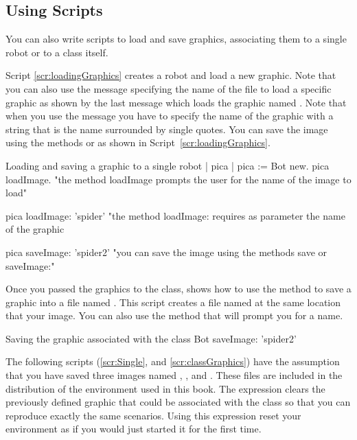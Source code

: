 \subsection{Using Scripts}
You can also write scripts to load and save graphics, associating them to a single robot or to a class itself. 

Script \ref{scr:loadingGraphics} creates a robot and load a new graphic. Note that you can also use the message  specifying the name of the file to load a specific graphic as shown by the last message which loads the graphic named . Note that when you use the message  you have to specify the name of the graphic with a string that is the name surrounded by single quotes. You can save the image using the methods  or  as shown in Script~\ref{scr:loadingGraphics}.


\begin{scriptwithtitle}{Loading and saving a graphic to a single robot}\label{scr:loadingGraphics}
| pica |
pica := Bot new. 
pica loadImage.
"the method loadImage prompts the user for the name of the image to load"

pica loadImage: 'spider'
"the method loadImage: requires as parameter the name of the graphic

pica saveImage: 'spider2'
"you can save the image using the methods save or saveImage:"
\end{scriptwithtitle}


Once you passed the graphics to the class,  shows how to use the method  to save a graphic into a file named . This script creates a file named  at the same location that your \sq image. You can also use the method  that will prompt you for a name. 

\begin{scriptwithtitle}{Saving the graphic associated with the class}\label{scr:savingGraphics}
Bot saveImage: 'spider2'
\end{scriptwithtitle}


The following scripts (\ref{scr:Single}, and \ref{scr:classGraphics}) have the assumption that you have saved three images named , , and . These files are included in the distribution of the environment used in this book. The expression  clears the previously defined graphic that could be associated with the class  so that you can reproduce exactly the same scenarios. Using this expression reset your environment as if you would just started it for the first time. 

